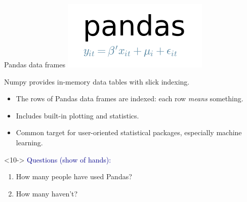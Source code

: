 \documentclass[aspectratio=169]{beamer}
\begin{document}
\begin{frame}{Pandas data frames}
\vspace{0.35 cm}
\hfill \includegraphics[height=1.3 cm]{pandas-logo.png}

\vspace{-1.3 cm}
Numpy provides in-memory data tables with slick indexing.

\vspace{0.05 cm}

\vspace{0.05 cm}

\vspace{0.35 cm}

\begin{itemize}\setlength{\itemsep}{0.1 cm}
\item<5-> The rows of Pandas data frames are indexed: each row {\it means} something.

\vspace{0.1 cm}

\vspace{0.1 cm}

\item<8-> Includes built-in plotting and statistics.

\item<9-> Common target for user-oriented statistical packages, especially machine learning.
\end{itemize}

\vspace{0.35 cm}
\begin{uncoverenv}<10->
\small
\textcolor{darkblue}{Questions (show of hands):}
\vspace{-0.2 cm}
\begin{enumerate}\setlength{\itemsep}{-0.1 cm}
\item How many people have used Pandas?
\item How many haven't?
\end{enumerate}
\end{uncoverenv}
\end{frame}
\end{document}
